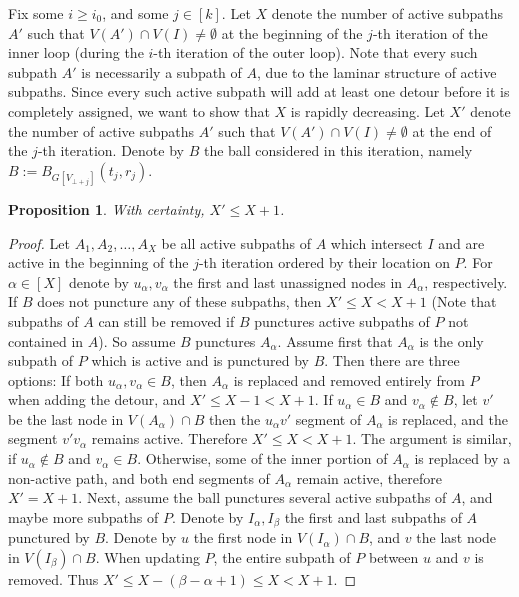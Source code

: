 \documentclass[twoside,leqno,twocolumn]{article}
\newtheorem{proposition}[theorem]{Proposition}
\providecommand{\eqdef}{:=}
\begin{document}
Fix some $i \ge i_0$, and some $j \in [k]$.
Let $X$ denote the number of active subpaths $A'$ such that $V(A') \cap V(I) \ne \emptyset$ at the beginning of the $j$-th iteration of the inner loop (during the $i$-th iteration of the outer loop). Note that every such subpath $A'$ is necessarily a subpath of $A$, due to the laminar structure of active subpaths. Since every such active subpath will add at least one detour before it is completely assigned, we want to show that $X$ is rapidly decreasing.
Let $X'$ denote the number of active subpaths $A'$ such that $V(A') \cap V(I) \ne \emptyset$ at the end of the $j$-th iteration. Denote by $B$ the ball considered in this iteration, namely $B \eqdef B_{G[V_{\bot+j}]}(t_j,r_j)$.
\begin{proposition} \label{p:maxBirth}
With certainty, $X' \le X+1$.
\end{proposition} 

\begin{proof}
Let $A_1,A_2,\ldots,A_X$ be all active subpaths of $A$ which intersect $I$ and are active in the beginning of the $j$-th iteration ordered by their location on $P$. For $\alpha \in [X]$ denote by $u_\alpha,v_\alpha$ the first and last unassigned nodes in $A_\alpha$, respectively. If $B$ does not puncture any of these subpaths, then $X' \le X < X+1$ (Note that subpaths of $A$ can still be removed if $B$ punctures active subpaths of $P$ not contained in $A$). So assume $B$ punctures $A_\alpha$.
Assume first that $A_\alpha$ is the only subpath of $P$ which is active and is punctured by $B$. Then there are three options:
If both $u_\alpha,v_\alpha \in B$, then $A_\alpha$ is replaced and removed entirely from $P$ when adding the detour, and $X' \le X-1 < X+1$.
If $u_\alpha \in B$ and $v_\alpha \notin B$, let $v'$ be the last node in $V(A_\alpha) \cap B$ then the $u_\alpha v'$ segment of $A_\alpha$ is replaced, and the segment $v'v_\alpha$ remains active. Therefore $X' \le X < X+1$. The argument is similar, if $u_\alpha \notin B$ and $v_\alpha \in B$.
Otherwise, some of the inner portion of $A_\alpha$ is replaced by a non-active path, and both end segments of $A_\alpha$ remain active, therefore $X' = X+1$.
Next, assume the ball punctures several active subpaths of $A$, and maybe more subpaths of $P$. Denote by $I_\alpha, I_\beta$ the first and last subpaths of $A$ punctured by $B$. Denote by $u$ the first node in $V(I_\alpha) \cap B$, and $v$ the last node in $V(I_\beta) \cap B$. When updating $P$, the entire subpath of $P$ between $u$ and $v$ is removed. 
Thus $X' \le X -(\beta - \alpha + 1) \le X < X+1$.
\end{proof}
\end{document}
